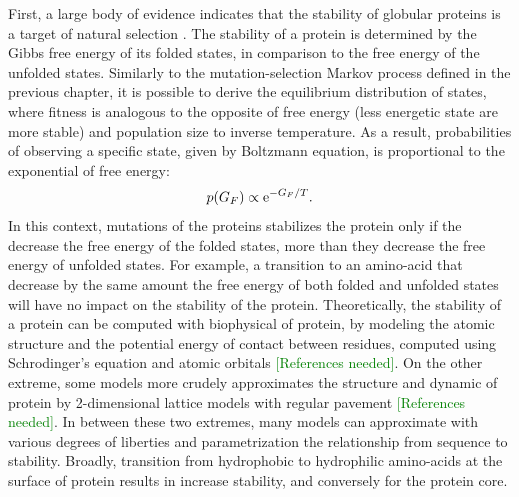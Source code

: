 First, a large body of evidence indicates that the stability of globular proteins is a target of natural selection \citep{Sikosek2014}.
The stability of a protein is determined by the Gibbs free energy of its folded states, in comparison to the free energy of the unfolded states.
Similarly to the mutation-selection Markov process defined in the previous chapter, it is possible to derive the equilibrium distribution of states, where fitness is analogous to the opposite of free energy (less energetic state are more stable) and population size to inverse temperature.
As a result, probabilities of observing a specific state, given by Boltzmann equation, is proportional to the exponential of free energy:
\begin{align}
p(G_F)\propto \mathrm{e}^{- G_F / T}.
\end{align}
In this context, mutations of the proteins stabilizes the protein only if the decrease the free energy of the folded states, more than they decrease the free energy of unfolded states.
For example, a transition to an amino-acid that decrease by the same amount the free energy of both folded and unfolded states will have no impact on the stability of the protein.
Theoretically, the stability of a protein can be computed with biophysical of protein, by modeling the atomic structure and the potential energy of contact between residues, computed using Schrodinger's equation and atomic orbitals \textcolor{GREEN}{[References needed]}.
On the other extreme, some models more crudely approximates the structure and dynamic of protein by 2-dimensional lattice models with regular pavement \textcolor{GREEN}{[References needed]}. 
In between these two extremes, many models can approximate with various degrees of liberties and parametrization the relationship from sequence to stability.
Broadly, transition from hydrophobic to hydrophilic amino-acids at the surface of protein results in increase stability, and conversely for the protein core.

